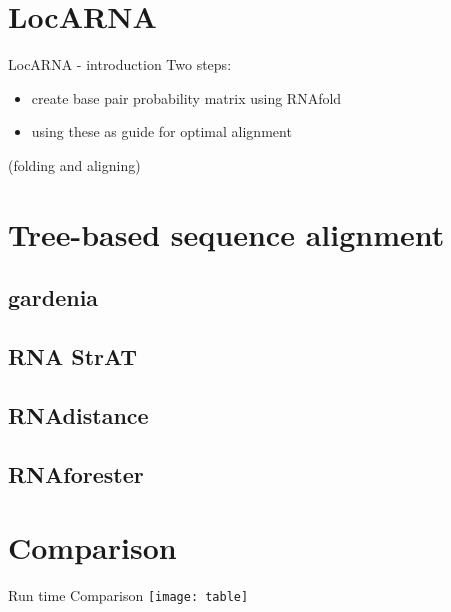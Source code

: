 



% 


\section{LocARNA}

\begin{frame}[c]{LocARNA - introduction}
    Two steps:
    \begin{itemize}
    \pause
    \item create base pair probability matrix using RNAfold
    \pause
    \item using these as guide for optimal alignment
    \pause
    \end{itemize}
    (folding and aligning)
\end{frame}


\section{Tree-based sequence alignment}

\subsection{gardenia}

\subsection{RNA StrAT}

\subsection{RNAdistance}

\subsection{RNAforester}



\section{Comparison}

\begin{frame}[c]{Run time Comparison}
    \center
    \texttt{[image: table]}
\end{frame}

